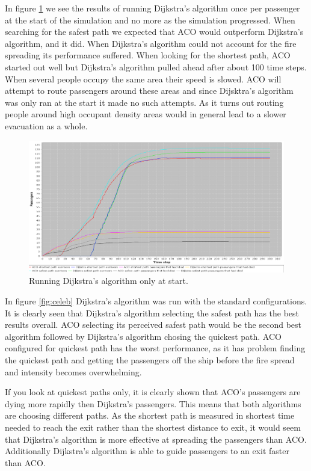 In figure \ref{fig:celebDF} we see the results of running Dijkstra's algorithm once per passenger at the start of the simulation and no more as the simulation progressed. When searching for the safest path we expected that ACO would outperform Dijkstra's algorithm, and it did. When Dijkstra's algorithm could not account for the fire spreading its performance suffered. When looking for the shortest path, ACO started out well but Dijkstra's algorithm pulled ahead after about 100 time steps. When several people occupy the same area their speed is slowed. ACO will attempt to route passengers around these areas and since Dijsktra's algorithm was only ran at the start it made no such attempts. As it turns out routing people around high occupant density areas would in general lead to a slower evacuation as a whole.

\begin{figure} [h]
\centering
\hspace*{-1.0in}
\includegraphics[scale=0.35]{images/Graph-using-1000-rounds-140-passangers-and-one-fire-dijkstra-one-time.png}
\caption{Running Dijkstra's algorithm only at start.}
\label{fig:celebDF}
\end{figure}

In figure \ref{fig:celeb} Dijkstra's algorithm was run with the standard configurations. It is clearly seen that Dijkstra's algorithm selecting the safest path has the best results overall. ACO selecting its perceived safest path would be the second best algorithm followed by Dijkstra's algorithm chosing the quickest path. ACO configured for quickest path has the worst performance, as it has problem finding the quickest path and getting the passengers off the ship before the fire spread and intensity becomes overwhelming.

If you look at quickest paths only, it is clearly shown that ACO's passengers are dying more rapidly then Dijkstra's passengers. This means that both algorithms are choosing different paths. As the shortest path is measured in shortest time needed to reach the exit rather than the shortest distance to exit, it would seem that Dijkstra's algorithm is more effective at spreading the passengers than ACO. Additionally Dijkstra's algorithm is able to guide passengers to an exit faster than ACO.

